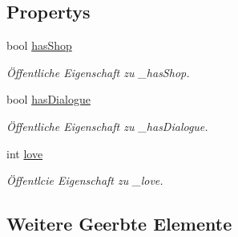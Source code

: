 \subsection*{Propertys}
\begin{DoxyCompactItemize}
\item 
bool \hyperlink{class_gruppe22_1_1_backend_1_1_n_p_c_a0193fbcb07006b019c6065f5141c9da4}{has\-Shop}
\begin{DoxyCompactList}\small\item\em Öffentliche Eigenschaft zu \-\_\-has\-Shop. \end{DoxyCompactList}\item 
bool \hyperlink{class_gruppe22_1_1_backend_1_1_n_p_c_aef91a83236e696ba3707b3514baef884}{has\-Dialogue}
\begin{DoxyCompactList}\small\item\em Öffentliche Eigenschaft zu \-\_\-has\-Dialogue. \end{DoxyCompactList}\item 
int \hyperlink{class_gruppe22_1_1_backend_1_1_n_p_c_a6bdbcf8d62b4bc5605e7949012197908}{love}
\begin{DoxyCompactList}\small\item\em Öffentlcie Eigenschaft zu \-\_\-love. \end{DoxyCompactList}\end{DoxyCompactItemize}
\subsection*{Weitere Geerbte Elemente}


